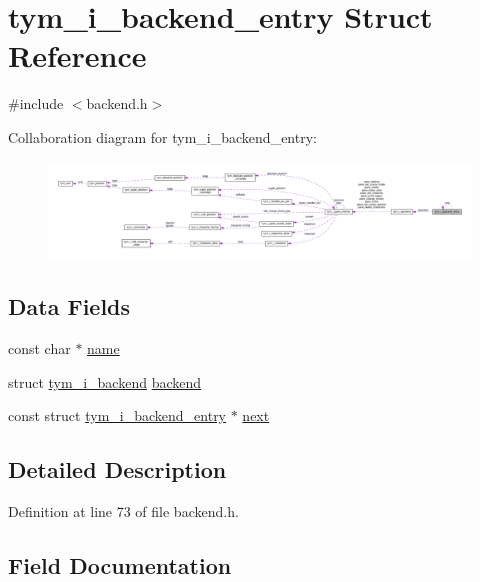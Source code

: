 \hypertarget{structtym__i__backend__entry}{}\section{tym\+\_\+i\+\_\+backend\+\_\+entry Struct Reference}
\label{structtym__i__backend__entry}


{\ttfamily \#include $<$backend.\+h$>$}



Collaboration diagram for tym\+\_\+i\+\_\+backend\+\_\+entry\+:
\nopagebreak
\begin{figure}[H]
\begin{center}
\leavevmode
\includegraphics[width=350pt]{structtym__i__backend__entry__coll__graph}
\end{center}
\end{figure}
\subsection*{Data Fields}
\begin{DoxyCompactItemize}
\item 
const char $\ast$ \hyperlink{structtym__i__backend__entry_abc39107ed565fd8c35370447417eedfc}{name}
\item 
struct \hyperlink{structtym__i__backend}{tym\+\_\+i\+\_\+backend} \hyperlink{structtym__i__backend__entry_a4b704ae50db3e520c36d3fa75e93b28c}{backend}
\item 
const struct \hyperlink{structtym__i__backend__entry}{tym\+\_\+i\+\_\+backend\+\_\+entry} $\ast$ \hyperlink{structtym__i__backend__entry_a52978e3325ccdb0f6bcf2bb98e457872}{next}
\end{DoxyCompactItemize}


\subsection{Detailed Description}


Definition at line 73 of file backend.\+h.



\subsection{Field Documentation}
\mbox{\label{structtym__i__backend__entry_a4b704ae50db3e520c36d3fa75e93b28c}} 
